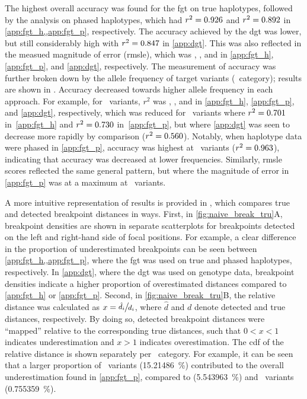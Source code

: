 The highest overall accuracy was found for the \gls{fgt} on true haplotypes, followed by the analysis on phased haplotypes, which had ${r^2 = \dec{0.9262482}}$ and ${r^2 = \dec{0.8922048}}$ in \cref{app:fgt_h,,app:fgt_p}, respectively.
The accuracy achieved by the \gls{dgt} was lower, but still considerably high with ${r^2 = \dec{0.8474036}}$ in \cref{app:dgt}.
This was also reflected in the measued magnitude of error (\gls{rmsle}), which was , , and  in \ref{app:fgt_h}, \ref{app:fgt_p}, and \ref{app:dgt}, respectively.
The measurement of accuracy was further broken down by the allele frequency of target variants (\fk{}~category); results are shown in .
Accuracy decreased towards higher allele frequency in each approach.
For example, for ~variants, $r^2$ was , , and  in \ref{app:fgt_h}, \ref{app:fgt_p}, and \ref{app:dgt}, respectively,
which was reduced for ~variants where ${r^2 = \dec{0.701}}$ in~\ref{app:fgt_h} and ${r^2 = \dec{0.730}}$ in~\ref{app:fgt_p}, but where \ref{app:dgt} was seen to decrease more rapidly by comparison (${r^2 = \dec{0.560}}$).
Notably, when haplotype data were phased in \ref{app:fgt_p}, accuracy was highest at ~variants (${r^2 = \dec{0.963}}$), indicating that accuracy was decreased at lower frequencies.
Similarly, \gls{rmsle} scores reflected the same general pattern, but where the magnitude of error in \ref{app:fgt_p} was at a maximum at ~variants.

%

%

A more intuitive representation of results is provided in , which compares true and detected breakpoint distances in  ways.
First, in \cref{fig:naive_break_tru}{A}, breakpoint densities are shown in separate scatterplots for breakpoints detected on the left and right-hand side of focal positions.
For example, a clear difference in the proportion of underestimated breakpoints can be seen between \cref{app:fgt_h,,app:fgt_p}, \ie where the \gls{fgt} was used on true and phased haplotypes, respectively.
In \cref{app:dgt}, where the \gls{dgt} was used on genotype data, breakpoint densities indicate a higher proportion of overestimated distances compared to \ref{app:fgt_h} or \ref{app:fgt_p}.
Second, in \cref{fig:naive_break_tru}{B}, the relative distance was calculated as ${x=\large \sfrac{\hat{d}_i}{d_i}}$, where $\hat{d}$ and $d$ denote detected and true distances, respectively.
By doing so, detected breakpoint distances were ``mapped'' relative to the corresponding true distances, such that ${0<x<1}$ indicates underestimation and ${x>1}$ indicates overestimation.
The \gls{cdf} of the relative distance is shown separately per \fk{}~category.
For example, it can be seen that a larger proportion of ~variants (\SI{15.21486}{\percent}) contributed to the overall underestimation found in \cref{app:fgt_p}, \eg compared to  (\SI{5.543963}{\percent}) and ~variants (\SI{0.755359}{\percent}).


